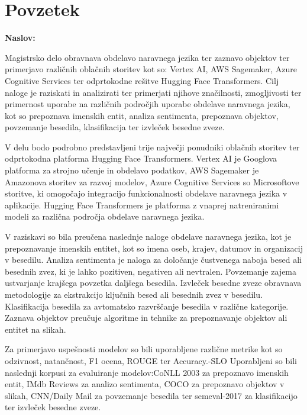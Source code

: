\chapter{Povzetek}

\noindent\textbf{Naslov:} \ttitle
\bigskip

Magistrsko delo obravnava obdelavo naravnega jezika ter zaznavo objektov ter primerjavo različnih oblačnih storitev kot so: Vertex AI, AWS Sagemaker, Azure Cognitive Services ter odprtokodne rešitve Hugging Face Transformers. Cilj naloge je raziskati in analizirati ter primerjati njihove značilnosti, zmogljivosti ter primernost uporabe na različnih področjih uporabe obdelave naravnega jezika, kot so prepoznava imenskih entit, analiza sentimenta, prepoznava objektov, povzemanje besedila, klasifikacija ter izvleček besedne zveze.

V delu bodo podrobno predstavljeni trije  največji ponudniki oblačnih storitev ter odprtokodna platforma Hugging Face Transformers. Vertex AI je Googlova platforma za strojno učenje in obdelavo podatkov, AWS Sagemaker je Amazonova storitev za razvoj modelov, Azure Cognitive Services so Microsoftove storitve, ki omogočajo integracijo funkcionalnosti obdelave naravnega jezika v aplikacije. Hugging Face Transformers  je platforma z vnaprej natreniranimi modeli za različna področja obdelave naravnega jezika.

V raziskavi so bila preučena naslednje naloge obdelave naravnega jezika, kot je prepoznavanje imenskih entitet, kot so imena oseb, krajev, datumov in organizacij v besedilu.
Analiza sentimenta je naloga za določanje čustvenega naboja besed ali besednih zvez, ki je lahko pozitiven, negativen ali nevtralen. Povzemanje zajema ustvarjanje krajšega povzetka daljšega besedila. Izvleček besedne zveze obravnava metodologije za ekstrakcijo ključnih besed ali besednih zvez v besedilu. 
Klasifikacija besedila za avtomatsko razvrščanje besedila v različne kategorije. Zaznava objektov preučuje algoritme in tehnike za prepoznavanje objektov ali entitet na slikah.

Za primerjavo uspešnosti modelov so bili uporabljene različne metrike kot so odzivnost, natančnost, F1 ocena, ROUGE ter Accuracy.-SLO Uporabljeni so bili naslednji korpusi za  evaluiranje modelov:CoNLL 2003 za prepoznavo imenskih entit, IMdb Reviews za analizo sentimenta, COCO za prepoznavo objektov v slikah, CNN/Daily Mail za povzemanje besedila ter semeval-2017 za klasifikacijo ter izvleček besedne zveze.

